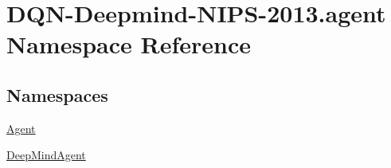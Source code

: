 \hypertarget{namespaceDQN-Deepmind-NIPS-2013_1_1agent}{}\section{D\+Q\+N-\/\+Deepmind-\/\+N\+I\+P\+S-\/2013.agent Namespace Reference}
\label{namespaceDQN-Deepmind-NIPS-2013_1_1agent}
\subsection*{Namespaces}
\begin{DoxyCompactItemize}
\item 
 \hyperlink{namespaceDQN-Deepmind-NIPS-2013_1_1agent_1_1Agent}{Agent}
\item 
 \hyperlink{namespaceDQN-Deepmind-NIPS-2013_1_1agent_1_1DeepMindAgent}{Deep\+Mind\+Agent}
\end{DoxyCompactItemize}
